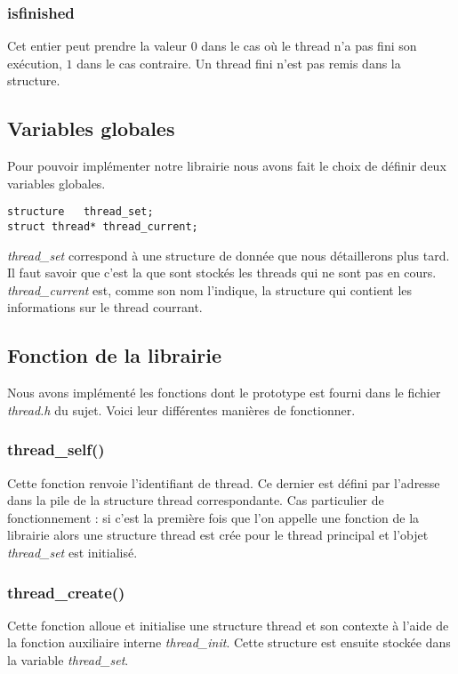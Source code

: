 \subsubsection{isfinished}
Cet entier peut prendre la valeur $0$ dans le cas où le thread n'a pas
fini son exécution, $1$ dans le cas contraire. Un thread fini n'est
pas remis dans la structure.


\subsection{Variables globales}
Pour pouvoir implémenter notre librairie nous avons fait le choix de
définir deux variables globales.
\begin{verbatim}
structure   thread_set;
struct thread* thread_current;
\end{verbatim}
\textit{thread\_set} correspond à une structure de donnée que nous
détaillerons plus tard. Il faut savoir que c'est la que sont stockés
les threads qui ne sont pas en cours.  \textit{thread\_current} est,
comme son nom l'indique, la structure qui contient les informations
sur le thread courrant.

\subsection{Fonction de la librairie}
Nous avons implémenté les fonctions dont le prototype est fourni dans
le fichier \textit{thread.h} du sujet. Voici leur différentes manières
de fonctionner.

\subsubsection{thread\_self()}
Cette fonction renvoie l'identifiant de thread. Ce dernier est défini
par l'adresse dans la pile de la structure thread correspondante.
Cas particulier de fonctionnement : si c'est la première fois que l'on
appelle une fonction de la librairie alors une structure thread est
crée pour le thread principal et l'objet \textit{thread\_set} est
initialisé.

\subsubsection{thread\_create()}
Cette fonction alloue et initialise une structure thread et son
contexte à l'aide de la fonction auxiliaire interne
\textit{thread\_init}.  Cette structure est ensuite stockée dans la
variable \textit{thread\_set}.

